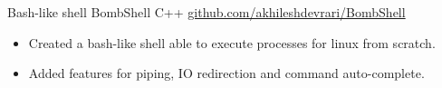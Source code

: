 \documentclass[]{awesome-cv}
\begin{document}
\begin{cventries}
	\vspace{-5mm}
	\cventry
	{Bash-like shell}
	{BombShell}
	{C++}
	{\href{https://github.com/akhileshdevrari/BombShell}{github.com/akhileshdevrari/BombShell}}
	{
		\vspace{-3mm}
		\begin{itemize}
			\item Created a bash-like shell able to execute processes for linux from scratch.
			\item Added features for piping, IO redirection and command auto-complete.
		\end{itemize}	
	}
	
\end{cventries}


\vspace{-3mm}


%
%	
%
\end{document}
